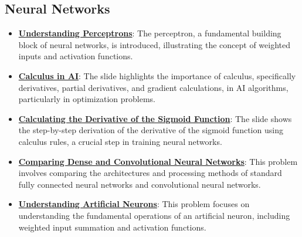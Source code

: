 \documentclass{article}%
\begin{document}
\subsection{Neural Networks}%
\label{subsec:NeuralNetworks}%
\begin{itemize}[leftmargin=*]%
\item \href{https://purdue.brightspace.com/d2l/common/assets/pdfjs-d2l-dist/1.0.14-legacy/web/viewer.html?file=%2Fcontent%2Fenforced%2F1095467-wl.202510.CS.24300.001%2F04L1-Linear Algebra Primer.pdf%3Fou%3D1095467&lang=en-us&container=d2l-fileviewer-rendered-pdf&fullscreen=d2l-fileviewer-rendered-pdf-dialog&height=667#page=17}{\textbf{Understanding Perceptrons}}: The perceptron, a fundamental building block of neural networks, is introduced, illustrating the concept of weighted inputs and activation functions.%
\item \href{https://purdue.brightspace.com/d2l/common/assets/pdfjs-d2l-dist/1.0.14-legacy/web/viewer.html?file=%2Fcontent%2Fenforced%2F1095467-wl.202510.CS.24300.001%2F04L1-Linear Algebra Primer.pdf%3Fou%3D1095467&lang=en-us&container=d2l-fileviewer-rendered-pdf&fullscreen=d2l-fileviewer-rendered-pdf-dialog&height=667#page=19}{\textbf{Calculus in AI}}: The slide highlights the importance of calculus, specifically derivatives, partial derivatives, and gradient calculations, in AI algorithms, particularly in optimization problems.%
\item \href{https://purdue.brightspace.com/d2l/common/assets/pdfjs-d2l-dist/1.0.14-legacy/web/viewer.html?file=%2Fcontent%2Fenforced%2F1095467-wl.202510.CS.24300.001%2F04L1-Linear Algebra Primer.pdf%3Fou%3D1095467&lang=en-us&container=d2l-fileviewer-rendered-pdf&fullscreen=d2l-fileviewer-rendered-pdf-dialog&height=667#page=21}{\textbf{Calculating the Derivative of the Sigmoid Function}}: The slide shows the step-by-step derivation of the derivative of the sigmoid function using calculus rules, a crucial step in training neural networks.%
\item \href{https://purdue.brightspace.com/d2l/common/assets/pdfjs-d2l-dist/1.0.14-legacy/web/viewer.html?file=%2Fcontent%2Fenforced%2F1095467-wl.202510.CS.24300.001%2F09L1-cnn.pdf%3Fou%3D1095467&lang=en-us&container=d2l-fileviewer-rendered-pdf&fullscreen=d2l-fileviewer-rendered-pdf-dialog&height=667#page=4}{\textbf{Comparing Dense and Convolutional Neural Networks}}: This problem involves comparing the architectures and processing methods of standard fully connected neural networks and convolutional neural networks.%
\item \href{https://purdue.brightspace.com/d2l/common/assets/pdfjs-d2l-dist/1.0.14-legacy/web/viewer.html?file=%2Fcontent%2Fenforced%2F1095467-wl.202510.CS.24300.001%2F09L1-cnn.pdf%3Fou%3D1095467&lang=en-us&container=d2l-fileviewer-rendered-pdf&fullscreen=d2l-fileviewer-rendered-pdf-dialog&height=667#page=5}{\textbf{Understanding Artificial Neurons}}: This problem focuses on understanding the fundamental operations of an artificial neuron, including weighted input summation and activation functions.%

\end{itemize}
\end{document}
